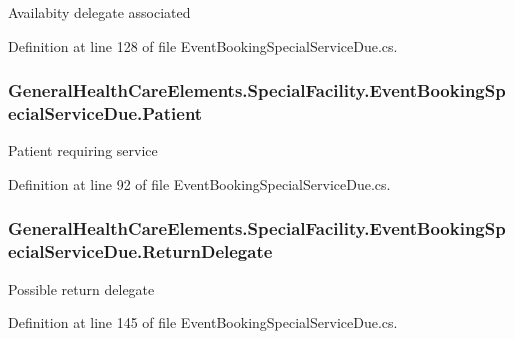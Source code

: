 Availabity delegate associated 



Definition at line 128 of file Event\+Booking\+Special\+Service\+Due.\+cs.

\subsubsection[{\texorpdfstring{Patient}{Patient}}]{ General\+Health\+Care\+Elements.\+Special\+Facility.\+Event\+Booking\+Special\+Service\+Due.\+Patient\hspace{0.3cm}{\ttfamily [get]}}\hypertarget{class_general_health_care_elements_1_1_special_facility_1_1_event_booking_special_service_due_a571b4adc4f938f80977c70bba17cf5ea}{}\label{class_general_health_care_elements_1_1_special_facility_1_1_event_booking_special_service_due_a571b4adc4f938f80977c70bba17cf5ea}


Patient requiring service 



Definition at line 92 of file Event\+Booking\+Special\+Service\+Due.\+cs.

\subsubsection[{\texorpdfstring{Return\+Delegate}{ReturnDelegate}}]{ General\+Health\+Care\+Elements.\+Special\+Facility.\+Event\+Booking\+Special\+Service\+Due.\+Return\+Delegate\hspace{0.3cm}{\ttfamily [get]}}\hypertarget{class_general_health_care_elements_1_1_special_facility_1_1_event_booking_special_service_due_a00a1a13a9e317e70d85e00ab2634b06b}{}\label{class_general_health_care_elements_1_1_special_facility_1_1_event_booking_special_service_due_a00a1a13a9e317e70d85e00ab2634b06b}


Possible return delegate 



Definition at line 145 of file Event\+Booking\+Special\+Service\+Due.\+cs.


